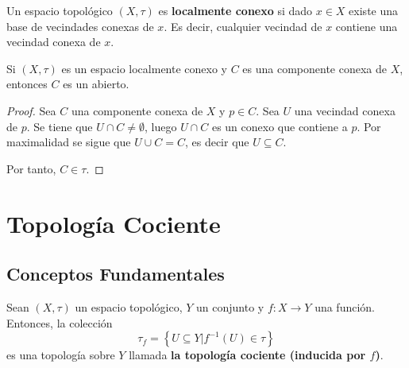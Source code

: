 \documentclass[12pt]{report}
\theoremstyle{largebreak}
\newcommand\cf[3]{\ensuremath{#1:#2\rightarrow#3}}
\begin{document}
    \begin{mydef}
        Un espacio topológico $(X,\tau)$ es \textbf{localmente conexo} si dado $x\in X$ existe una base de vecindades conexas de $x$. Es decir, cualquier vecindad de $x$ contiene una vecindad conexa de $x$.
    \end{mydef}

    \begin{propo}
        Si $(X,\tau)$ es un espacio localmente conexo y $C$ es una componente conexa de $X$, entonces $C$ es un abierto.
    \end{propo}

    \begin{proof}
        Sea $C$ una componente conexa de $X$ y $p\in C$. Sea $U$ una vecindad conexa de $p$. Se tiene que $U\cap C\neq\emptyset$, luego $U\cap C$ es un conexo que contiene a $p$. Por maximalidad se sigue que $U\cup C=C$, es decir que $U\subseteq C$.

        Por tanto, $C\in\tau$.
    \end{proof}

    \chapter{Topología Cociente}

    \section{Conceptos Fundamentales}

    \begin{propo}
        Sean $(X,\tau)$ un espacio topológico, $Y$ un conjunto y $\cf{f}{X}{Y}$ una función. Entonces, la colección
        \begin{equation*}
            \tau_f=\left\{U\subseteq Y\Big|f^{-1}(U)\in\tau\right\}
        \end{equation*}
        es una topología sobre $Y$ llamada \textbf{la topología cociente (inducida por $f$)}.
    \end{propo}
\end{document}
